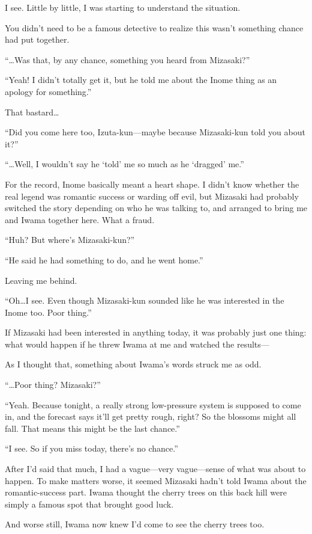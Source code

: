 \documentclass[
    a4paper,
    12pt,
    twoside,
    openany,
    UTF8,
    fontset=windows
]{ctexbook}
\begin{document}
I see. Little by little, I was starting to understand the situation.

You didn't need to be a famous detective to realize this wasn't something chance had put together.

``\dots Was that, by any chance, something you heard from Mizasaki?''

``Yeah! I didn't totally get it, but he told me about the Inome thing as an apology for something.''

That bastard\dots

``Did you come here too, Izuta-kun---maybe because Mizasaki-kun told you about it?''

``\dots Well, I wouldn't say he `told' me so much as he `dragged' me.''

For the record, Inome basically meant a heart shape. I didn't know whether the real legend was romantic success or warding off evil, but Mizasaki had probably switched the story depending on who he was talking to, and arranged to bring me and Iwama together here. What a fraud.

``Huh? But where's Mizasaki-kun?''

``He said he had something to do, and he went home.''

Leaving me behind.

``Oh\dots I see. Even though Mizasaki-kun sounded like he was interested in the Inome too. Poor thing.''

If Mizasaki had been interested in anything today, it was probably just one thing: what would happen if he threw Iwama at me and watched the results---

As I thought that, something about Iwama's words struck me as odd.

``\dots Poor thing? Mizasaki?''

``Yeah. Because tonight, a really strong low-pressure system is supposed to come in, and the forecast says it'll get pretty rough, right? So the blossoms might all fall. That means this might be the last chance.''

``I see. So if you miss today, there's no chance.''

After I'd said that much, I had a vague---very vague---sense of what was about to happen. To make matters worse, it seemed Mizasaki hadn't told Iwama about the romantic-success part. Iwama thought the cherry trees on this back hill were simply a famous spot that brought good luck.

And worse still, Iwama now knew I'd come to see the cherry trees too.
\end{document}
